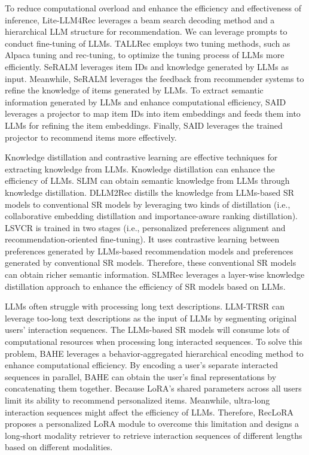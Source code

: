\documentclass[review]{fcs}
\begin{document}
	To reduce computational overload and enhance the efficiency and effectiveness of inference, Lite-LLM4Rec \cite{Lite-LLM4Rec} leverages a beam search decoding method and a hierarchical LLM structure for recommendation. We can leverage prompts to conduct fine-tuning of LLMs. TALLRec \cite{TALLRec} employs two tuning methods, such as Alpaca tuning and rec-tuning, to optimize the tuning process of LLMs more efficiently. SeRALM \cite{SeRALM} leverages item IDs and knowledge generated by LLMs as input. Meanwhile, SeRALM leverages the feedback from recommender systems to refine the knowledge of items generated by LLMs. To extract semantic information generated by LLMs and enhance computational efficiency, SAID \cite{SAID} leverages a projector to map item IDs into item embeddings and feeds them into LLMs for refining the item embeddings. Finally, SAID leverages the trained projector to recommend items more effectively.
	
	Knowledge distillation and contrastive learning are effective techniques for extracting knowledge from LLMs. Knowledge distillation can enhance the efficiency of LLMs. SLIM \cite{SLIM} can obtain semantic knowledge from LLMs through knowledge distillation. DLLM2Rec \cite{DLLM2Rec} distills the knowledge from LLMs-based SR models to conventional SR models by leveraging two kinds of distillation (i.e., collaborative embedding distillation and importance-aware ranking distillation). LSVCR \cite{LSVCR} is trained in two stages (i.e., personalized preferences alignment and recommendation-oriented fine-tuning). It uses contrastive learning between preferences generated by LLMs-based recommendation models and preferences generated by conventional SR models. Therefore, these conventional SR models can obtain richer semantic information. SLMRec\cite{SLMRec} leverages a layer-wise knowledge distillation approach to enhance the efficiency of SR models based on LLMs.
	
	LLMs often struggle with processing long text descriptions. LLM-TRSR \cite{LLM-TRSR} can leverage too-long text descriptions as the input of LLMs by segmenting original users' interaction sequences. The LLMs-based SR models will consume lots of computational resources when processing long interacted sequences. To solve this problem, BAHE \cite{BAHE} leverages a behavior-aggregated hierarchical encoding method to enhance computational efficiency. By encoding a user’s separate interacted sequences in parallel, BAHE can obtain the user’s final representations by concatenating them together. Because LoRA’s shared parameters across all users limit its ability to recommend personalized items. Meanwhile, ultra-long interaction sequences might affect the efficiency of LLMs. Therefore, RecLoRA \cite{RecLoRA}  proposes a personalized LoRA module to overcome this limitation and designs a long-short modality retriever to retrieve interaction sequences of different lengths based on different modalities.
	
\end{document}
